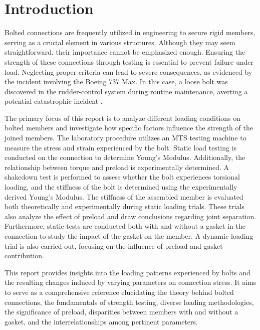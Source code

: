 \section{Introduction}
Bolted connections are frequently utilized in engineering to secure rigid members, serving as a crucial element in various structures. Although they may seem straightforward, their importance cannot be emphasized enough. Ensuring the strength of these connections through testing is essential to prevent failure under load. Neglecting proper criteria can lead to severe consequences, as evidenced by the incident involving the Boeing 737 Max. In this case, a loose bolt was discovered in the rudder-control system during routine maintenance, averting a potential catastrophic incident \cite{levenson_boeing_2023}.

The primary focus of this report is to analyze different loading conditions on bolted members and investigate how specific factors influence the strength of the joined members. The laboratory procedure utilizes an MTS testing machine to measure the stress and strain experienced by the bolt. Static load testing is conducted on the connection to determine Young's Modulus. Additionally, the relationship between torque and preload is experimentally determined. A shakedown test is performed to assess whether the bolt experiences torsional loading, and the stiffness of the bolt is determined using the experimentally derived Young's Modulus. The stiffness of the assembled member is evaluated both theoretically and experimentally during static loading trials. These trials also analyze the effect of preload and draw conclusions regarding joint separation. Furthermore, static tests are conducted both with and without a gasket in the connection to study the impact of the gasket on the member. A dynamic loading trial is also carried out, focusing on the influence of preload and gasket contribution.

This report provides insights into the loading patterns experienced by bolts and the resulting changes induced by varying parameters on connection stress. It aims to serve as a comprehensive reference elucidating the theory behind bolted connections, the fundamentals of strength testing, diverse loading methodologies, the significance of preload, disparities between members with and without a gasket, and the interrelationships among pertinent parameters.